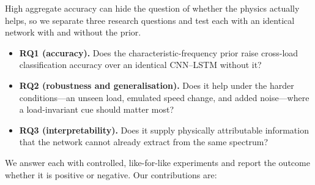 \documentclass[conference]{IEEEtran}
\begin{document}
High aggregate accuracy can hide the question of whether the physics actually
helps, so we separate three research questions and test each with an identical
network with and without the prior.
\begin{itemize}
\item \textbf{RQ1 (accuracy).} Does the characteristic-frequency prior raise
cross-load classification accuracy over an identical CNN--LSTM without it?
\item \textbf{RQ2 (robustness and generalisation).} Does it help under the
harder conditions---an unseen load, emulated speed change, and added
noise---where a load-invariant cue should matter most?
\item \textbf{RQ3 (interpretability).} Does it supply physically attributable
information that the network cannot already extract from the same spectrum?
\end{itemize}
We answer each with controlled, like-for-like experiments and report the
outcome whether it is positive or negative. Our contributions are:
\end{document}
